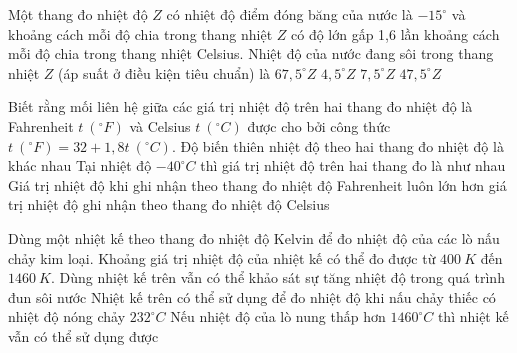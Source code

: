 \begin{ex} 
	Một thang đo nhiệt độ $Z$ có nhiệt độ điểm đóng băng của nước là $-15^\circ$ và khoảng cách mỗi độ chia trong thang nhiệt $Z$ có độ lớn gấp 1,6 lần khoảng cách mỗi độ chia trong thang nhiệt Celsius. Nhiệt độ của nước đang sôi trong thang nhiệt $Z$ (áp suất ở điều kiện tiêu chuẩn) là
	\choice
	{$67,5^\circ Z$}
	{$4,5^\circ Z$}
	{$7,5^\circ Z$}
	{\True $47,5^\circ Z$}
\end{ex}
\begin{ex} 
	Biết rằng mối liên hệ giữa các giá trị nhiệt độ trên hai thang đo nhiệt độ là Fahrenheit $t\ (^\circ F)$ và Celsius $t\ (^\circ C)$ được cho bởi công thức $t\ (^\circ F)=32+1,8t\ (^\circ C)$.
	{\True Độ biến thiên nhiệt độ theo hai thang đo nhiệt độ là khác nhau}
	{\True Tại nhiệt độ $-40^\circ C$ thì giá trị nhiệt độ trên hai thang đo là như nhau}
	{Giá trị nhiệt độ khi ghi nhận theo thang đo nhiệt độ Fahrenheit luôn lớn hơn giá trị nhiệt độ ghi nhận theo thang đo nhiệt độ Celsius}
\end{ex}
\begin{ex} 
	Dùng một nhiệt kế theo thang đo nhiệt độ Kelvin để đo nhiệt độ của các lò nấu chảy kim loại. Khoảng giá trị nhiệt độ của nhiệt kế có thể đo được từ $400 \ K$ đến $1460 \ K$.
	{Dùng nhiệt kế trên vẫn có thể khảo sát sự tăng nhiệt độ trong quá trình đun sôi nước}
	{\True Nhiệt kế trên có thể sử dụng để đo nhiệt độ khi nấu chảy thiếc có nhiệt độ nóng chảy $232^\circ C$}
	{Nếu nhiệt độ của lò nung thấp hơn $1460^\circ C$ thì nhiệt kế vẫn có thể sử dụng được}
\end{ex}

